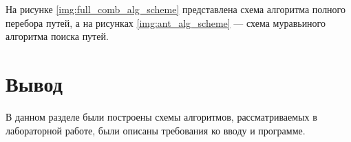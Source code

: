 На рисунке \ref{img:full_comb_alg_scheme} представлена схема алгоритма полного перебора путей, а на рисунках \ref{img:ant_alg_scheme} --- схема муравьиного алгоритма поиска путей.


\clearpage

\section*{Вывод}

В данном разделе были построены схемы алгоритмов, рассматриваемых в лабораторной работе, были описаны требования ко вводу и программе.